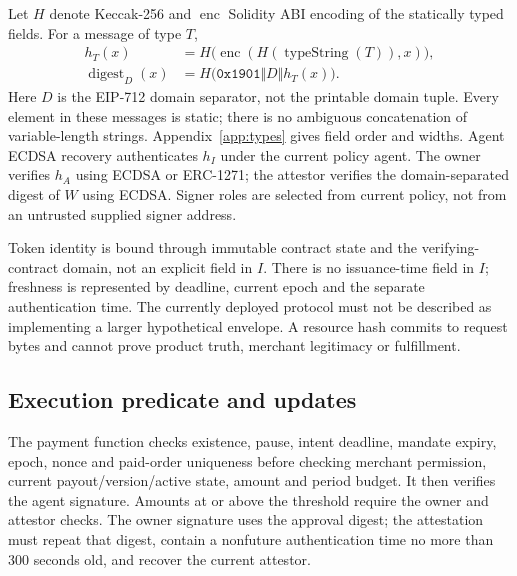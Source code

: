 \documentclass[11pt]{article}
\begin{document}
Let $H$ denote Keccak-256 and $\operatorname{enc}$ Solidity ABI encoding of the statically typed fields. For a message of type $T$,
\begin{align}
 h_T(x)&=H\bigl(\operatorname{enc}(H(\operatorname{typeString}(T)),x)\bigr),\\
 \operatorname{digest}_D(x)&=H\bigl(\mathtt{0x1901}\Vert D\Vert h_T(x)\bigr).
\end{align}
Here $D$ is the EIP-712 domain separator, not the printable domain tuple. Every element in these messages is static; there is no ambiguous concatenation of variable-length strings. Appendix~\ref{app:types} gives field order and widths. Agent ECDSA recovery authenticates $h_I$ under the current policy agent. The owner verifies $h_A$ using ECDSA or ERC-1271; the attestor verifies the domain-separated digest of $W$ using ECDSA. Signer roles are selected from current policy, not from an untrusted supplied signer address.

Token identity is bound through immutable contract state and the verifying-contract domain, not an explicit field in $I$. There is no issuance-time field in $I$; freshness is represented by deadline, current epoch and the separate authentication time. The currently deployed protocol must not be described as implementing a larger hypothetical envelope. A resource hash commits to request bytes and cannot prove product truth, merchant legitimacy or fulfillment.

\subsection{Execution predicate and updates}
The payment function checks existence, pause, intent deadline, mandate expiry, epoch, nonce and paid-order uniqueness before checking merchant permission, current payout/version/active state, amount and period budget. It then verifies the agent signature. Amounts at or above the threshold require the owner and attestor checks. The owner signature uses the approval digest; the attestation must repeat that digest, contain a nonfuture authentication time no more than 300 seconds old, and recover the current attestor.
\end{document}
